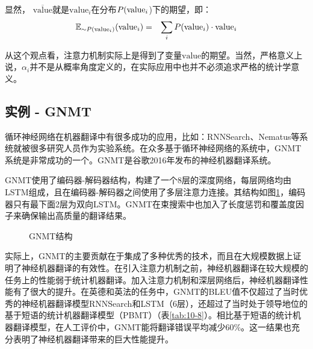 \noindent 显然， $\overline{\mathrm{value}}$就是$\mathrm{value}_i$在分布$ {P}( \mathrm{value}_i$)下的期望，即：
\begin{eqnarray}
\mathbb{E}_{\sim {P} ( {\mathrm{\mathrm{value}}}_i )} ({\mathrm{value}}_i) &=& \sum_i {P} ({\mathrm{value}}_i) \cdot {\mathrm{value}}_i
\label{eq:10-23}
\end{eqnarray}

从这个观点看，注意力机制实际上是得到了变量$\mathrm{value}$的期望。当然，严格意义上说，$\alpha_i$并不是从概率角度定义的，在实际应用中也并不必须追求严格的统计学意义。

\subsection{实例 - GNMT}
\vspace{0.5em}

\parinterval 循环神经网络在机器翻译中有很多成功的应用，比如：RNNSearch、Nematus等系统就被很多研究人员作为实验系统。在众多基于循环神经网络的系统中，GNMT系统是非常成功的一个。GNMT是谷歌2016年发布的神经机器翻译系统。

\parinterval GNMT使用了编码器-解码器结构，构建了一个8层的深度网络，每层网络均由LSTM组成，且在编码器-解码器之间使用了多层注意力连接。其结构如图\ref{fig:10-24}，编码器只有最下面2层为双向LSTM。GNMT在束搜索中也加入了长度惩罚和覆盖度因子来确保输出高质量的翻译结果。
\vspace{0.5em}

\begin{figure}[htp]
\centering

\caption{GNMT结构}
\label{fig:10-24}
\end{figure}

\parinterval 实际上，GNMT的主要贡献在于集成了多种优秀的技术，而且在大规模数据上证明了神经机器翻译的有效性。在引入注意力机制之前，神经机器翻译在较大规模的任务上的性能弱于统计机器翻译。加入注意力机制和深层网络后，神经机器翻译性能有了很大的提升。在英德和英法的任务中，GNMT的BLEU值不仅超过了当时优秀的神经机器翻译模型RNNSearch和LSTM（6层），还超过了当时处于领导地位的基于短语的统计机器翻译模型（PBMT）（表\ref{tab:10-8}）。相比基于短语的统计机器翻译模型，在人工评价中，GNMT能将翻译错误平均减少60\%。这一结果也充分表明了神经机器翻译带来的巨大性能提升。

